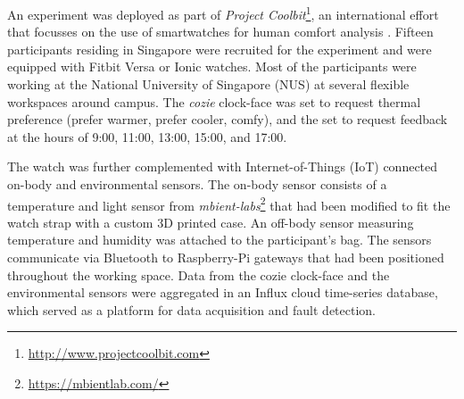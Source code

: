 
An experiment was deployed as part of \emph{Project Coolbit}\footnote{\url{http://www.projectcoolbit.com}}, an international effort that focusses on the use of smartwatches for human comfort analysis \cite{nazarian2019geophysics}. Fifteen participants residing in Singapore were recruited for the experiment and were equipped with Fitbit Versa or Ionic watches. Most of the participants were working at the National University of Singapore (NUS) at several flexible workspaces around campus.  The \emph{cozie} clock-face was set to request thermal preference (prefer warmer, prefer cooler, comfy), and the set to request feedback at the hours of 9:00, 11:00, 13:00, 15:00, and 17:00. 

The watch was further complemented with Internet-of-Things (IoT) connected on-body and environmental sensors. The on-body sensor consists of a temperature and light sensor from \emph{mbient-labs}\footnote{\url{https://mbientlab.com/}} that had been modified to fit the watch strap with a custom 3D printed case. An off-body sensor measuring temperature and humidity was attached to the participant's bag. The sensors communicate via Bluetooth to Raspberry-Pi gateways that had been positioned throughout the working space. Data from the cozie clock-face and the environmental sensors were aggregated in an Influx cloud time-series database, which served as a platform for data acquisition and fault detection. 



